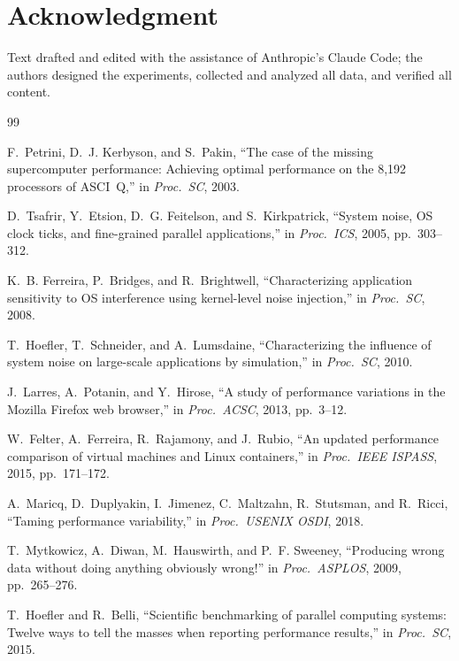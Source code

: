 \documentclass[10pt,conference]{IEEEtran}
\begin{document}
\section*{Acknowledgment}
Text drafted and edited with the assistance of Anthropic's Claude Code; the authors designed the experiments, collected and analyzed all data, and verified all content.


\begin{thebibliography}{99}

F.~Petrini, D.~J. Kerbyson, and S.~Pakin, ``The case of the missing
supercomputer performance: Achieving optimal performance on the 8,192
processors of ASCI~Q,'' in \emph{Proc.\ SC}, 2003.

D.~Tsafrir, Y.~Etsion, D.~G. Feitelson, and S.~Kirkpatrick, ``System noise,
OS clock ticks, and fine-grained parallel applications,'' in \emph{Proc.\ ICS}, 2005, pp.\ 303--312.

K.~B. Ferreira, P.~Bridges, and R.~Brightwell, ``Characterizing application
sensitivity to OS interference using kernel-level noise injection,'' in \emph{Proc.\ SC}, 2008.

T.~Hoefler, T.~Schneider, and A.~Lumsdaine, ``Characterizing the influence
of system noise on large-scale applications by simulation,'' in \emph{Proc.\ SC}, 2010.

J.~Larres, A.~Potanin, and Y.~Hirose, ``A study of performance variations in
the Mozilla Firefox web browser,'' in \emph{Proc.\ ACSC}, 2013, pp.\ 3--12.

W.~Felter, A.~Ferreira, R.~Rajamony, and J.~Rubio, ``An updated performance
comparison of virtual machines and Linux containers,'' in \emph{Proc.\ IEEE ISPASS}, 2015, pp.\ 171--172.

A.~Maricq, D.~Duplyakin, I.~Jimenez, C.~Maltzahn, R.~Stutsman, and R.~Ricci,
``Taming performance variability,'' in \emph{Proc.\ USENIX OSDI}, 2018.

T.~Mytkowicz, A.~Diwan, M.~Hauswirth, and P.~F. Sweeney, ``Producing wrong
data without doing anything obviously wrong!'' in \emph{Proc.\ ASPLOS}, 2009, pp.\ 265--276.

T.~Hoefler and R.~Belli, ``Scientific benchmarking of parallel computing
systems: Twelve ways to tell the masses when reporting performance
results,'' in \emph{Proc.\ SC}, 2015.


\end{thebibliography}
\end{document}
